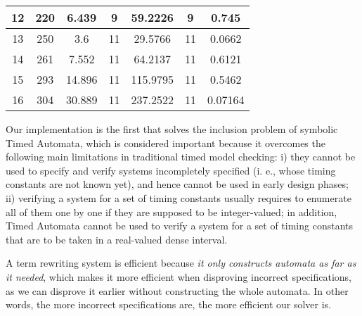 \documentclass[acmsmall,10pt,review]{acmart}
\begin{document}
{\begin{table}[!ht]
\begin{tabular} {c|c|c|c|c |c|c}
12   &    220   & 6.439&  9     &  59.2226   & 9   &   0.745   \\ \hline
13   &    250   & 3.6  &  11    &  29.5766   & 11  &   0.0662  \\ \hline
14   &    261   & 7.552&  11    &  64.2137   & 11  &   0.6121  \\ \hline     
15   &    293   & 14.896& 11   &  115.9795   & 11  &   0.5462   \\ \hline
16   &    304   &  30.889  &  11    & 237.2522    & 11  &  0.07164        \\ \hline            
\end{tabular}
\end{table}


Our implementation is the first that solves the  inclusion problem of symbolic Timed Automata, which is considered important because it overcomes the following main limitations in traditional timed model checking:  i) they cannot be used to specify and verify systems incompletely specified (i. e., whose timing constants are not known yet), and hence cannot be used in early design phases; ii) verifying a system for a set of timing constants usually requires to enumerate all of them one by one if they are supposed to be integer-valued; in addition, Timed Automata cannot be used to verify a system for a set of timing constants that are to be taken in a real-valued dense interval. 



A term rewriting system is efficient because \emph{it only constructs automata as far as it needed}, which makes it more efficient when disproving incorrect specifications, as we can disprove it earlier without constructing the whole automata. In other words, the more incorrect specifications are, the more efficient our solver is.

}
\end{document}
